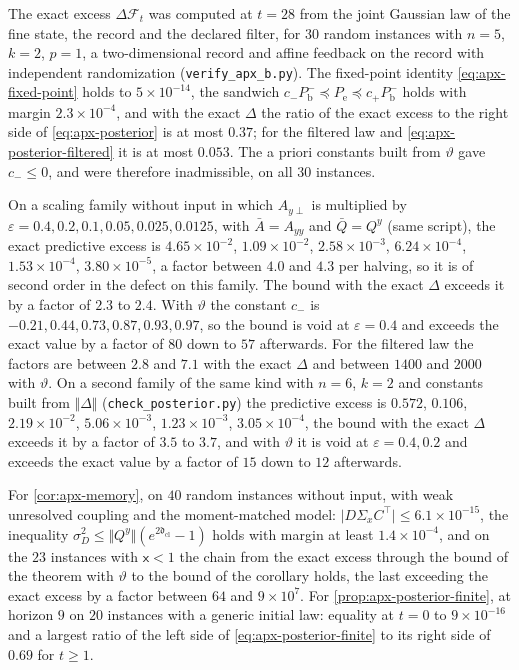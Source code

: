 \begin{numcheck}\label{chk:apx-posterior}
The exact excess $\Delta\mathcal F_t$ was computed at $t=28$ from the joint Gaussian law of the fine state, the record and the declared filter, for $30$ random instances with $n=5$, $k=2$, $p=1$, a two-dimensional record and affine feedback on the record with independent randomization (\texttt{verify\_apx\_b.py}). The fixed-point identity \cref{eq:apx-fixed-point} holds to $5\times10^{-14}$, the sandwich $c_-P^-_{\mathrm b}\preceq P_{\mathrm e}\preceq c_+P^-_{\mathrm b}$ holds with margin $2.3\times10^{-4}$, and with the exact $\Delta$ the ratio of the exact excess to the right side of \cref{eq:apx-posterior} is at most $0.37$; for the filtered law and \cref{eq:apx-posterior-filtered} it is at most $0.053$. The a priori constants built from $\vartheta$ gave $c_-\le0$, and were therefore inadmissible, on all $30$ instances.

On a scaling family without input in which $A_{y\perp}$ is multiplied by $\varepsilon=0.4,0.2,0.1,0.05,0.025,0.0125$, with $\bar A=A_{yy}$ and $\bar Q=Q^y$ (same script), the exact predictive excess is $4.65\times10^{-2}$, $1.09\times10^{-2}$, $2.58\times10^{-3}$, $6.24\times10^{-4}$, $1.53\times10^{-4}$, $3.80\times10^{-5}$, a factor between $4.0$ and $4.3$ per halving, so it is of second order in the defect on this family. The bound with the exact $\Delta$ exceeds it by a factor of $2.3$ to $2.4$. With $\vartheta$ the constant $c_-$ is $-0.21,0.44,0.73,0.87,0.93,0.97$, so the bound is void at $\varepsilon=0.4$ and exceeds the exact value by a factor of $80$ down to $57$ afterwards. For the filtered law the factors are between $2.8$ and $7.1$ with the exact $\Delta$ and between $1400$ and $2000$ with $\vartheta$. On a second family of the same kind with $n=6$, $k=2$ and constants built from $\Vert\Delta\Vert$ (\texttt{check\_posterior.py}) the predictive excess is $0.572$, $0.106$, $2.19\times10^{-2}$, $5.06\times10^{-3}$, $1.23\times10^{-3}$, $3.05\times10^{-4}$, the bound with the exact $\Delta$ exceeds it by a factor of $3.5$ to $3.7$, and with $\vartheta$ it is void at $\varepsilon=0.4,0.2$ and exceeds the exact value by a factor of $15$ down to $12$ afterwards.

For \cref{cor:apx-memory}, on $40$ random instances without input, with weak unresolved coupling and the moment-matched model: $\lvert D\Sigma_xC^\top\rvert\le6.1\times10^{-15}$, the inequality $\sigma_D^2\le\Vert Q^y\Vert(e^{2\mathfrak d_{\mathrm{cl}}}-1)$ holds with margin at least $1.4\times10^{-4}$, and on the $23$ instances with $\mathsf x<1$ the chain from the exact excess through the bound of the theorem with $\vartheta$ to the bound of the corollary holds, the last exceeding the exact excess by a factor between $64$ and $9\times10^7$. For \cref{prop:apx-posterior-finite}, at horizon $9$ on $20$ instances with a generic initial law: equality at $t=0$ to $9\times10^{-16}$ and a largest ratio of the left side of \cref{eq:apx-posterior-finite} to its right side of $0.69$ for $t\ge1$.
\end{numcheck}

